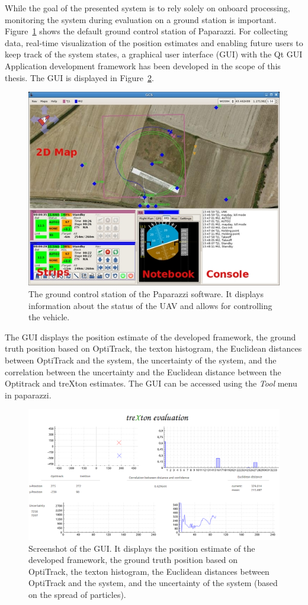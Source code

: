 \documentclass{report}
\begin{document}
While the goal of the presented system is to rely solely on onboard
processing, monitoring the system during evaluation on a ground
station is important. Figure~\ref{fig:gcs} shows the default ground
control station of Paparazzi. For collecting data, real-time
visualization of the position estimates and enabling future users to
keep track of the system states, a graphical user interface (GUI) with
the Qt GUI Application development framework has been developed in the
scope of this thesis. The GUI is displayed in Figure~\ref{fig:gui}.
\begin{figure}[t]
\begin{center}
\includegraphics[width=0.7\columnwidth]{Gcs}
\caption{{\label{fig:gcs} The ground control station of the Paparazzi
    software. It displays information about the status of the UAV and
    allows for controlling the vehicle.%
  }}
\end{center}
\end{figure}
The GUI displays the position estimate of the developed framework, the
ground truth position based on OptiTrack, the texton histogram, the
Euclidean distances between OptiTrack and the system, the uncertainty
of the system, and the correlation between the uncertainty and the
Euclidean distance between the Optitrack and treXton estimates. The
GUI can be accessed using the \emph{Tool} menu in paparazzi.
\begin{figure}[t]
\begin{center}
\includegraphics[width=\textwidth]{gui-cut}
\caption{{\label{fig:gui} Screenshot of the GUI. It displays the
    position estimate of the developed framework, the ground truth
    position based on OptiTrack, the texton histogram, the Euclidean
    distances between OptiTrack and the system, and the uncertainty of
    the system (based on the spread of particles).%
  }}
\end{center}
\end{figure}
\end{document}
